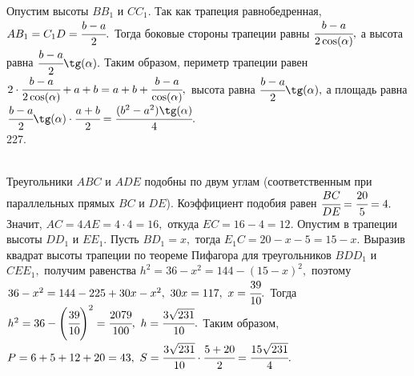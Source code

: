 \documentclass[12pt]{article}
\begin{document}
Опустим высоты $BB_1$ и $CC_1.$ Так как трапеция равнобедренная, $AB_1=C_1D=\cfrac{b-a}{2}.$ Тогда боковые стороны трапеции равны $\cfrac{b-a}{2\cos(\alpha)},$
а высота равна $\cfrac{b-a}{2}\tg(\alpha).$ Таким образом, периметр трапеции равен $2\cdot\cfrac{b-a}{2\cos(\alpha)}+a+b=a+b+\cfrac{b-a}{\cos(\alpha)},$ высота равна $\cfrac{b-a}{2}\tg(\alpha),$ а площадь равна $\cfrac{b-a}{2}\tg(\alpha)\cdot\cfrac{a+b}{2}=\cfrac{(b^2-a^2)\tg(\alpha)}{4}.$\\
227. \begin{figure}[ht!]
\end{figure}\\
Треугольники $ABC$ и $ADE$ подобны по двум углам (соответственным при параллельных прямых $BC$ и $DE$). Коэффициент подобия равен $\cfrac{BC}{DE}=\cfrac{20}{5}=4.$ Значит, $AC=4AE=4\cdot4=16,$ откуда $EC=16-4=12.$ Опустим в трапеции высоты $DD_1$ и $EE_1.$ Пусть $BD_1=x,$ тогда $E_1C=20-x-5=15-x.$ Выразив квадрат высоты трапеции по теореме Пифагора для треугольников $BDD_1$ и $CEE_1,$ получим равенства $h^2=36-x^2=144-(15-x)^2,$ поэтому $36-x^2=144-225+30x-x^2,\ 30x=117,\ x=\cfrac{39}{10}.$ Тогда $h^2=36-\left(\cfrac{39}{10}\right)^2=\cfrac{2079}{100},\ h=\cfrac{3\sqrt{231}}{10}.$ Таким образом, $P=6+5+12+20=43,\ S=\cfrac{3\sqrt{231}}{10}\cdot\cfrac{5+20}{2}=\cfrac{15\sqrt{231}}{4}.$\\
\end{document}
